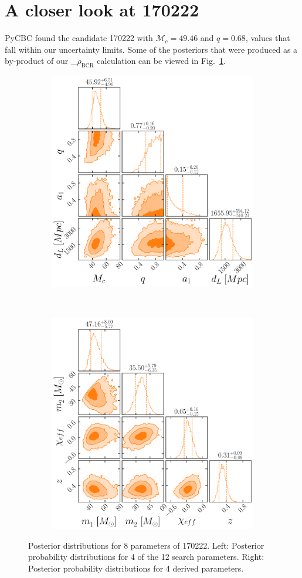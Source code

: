 \documentclass[%
 nofootinbib,
 amsmath,amssymb,
 aps,
 twocolumn,
 superscriptaddress
]{revtex4-2}
\newcommand{\mathcmd}[1]{{\sc \relax\ifmmode#1\else $#1$\fi}\xspace}
\newcommand{\bcr}{\mathcmd{\rho_\text{BCR}}}
\begin{document}



\section{A closer look at 170222}\label{apdx:170222}
PyCBC found the candidate 170222 with $\mathcal{M}_c=49.46$ and $q=0.68$, values that fall within our uncertainty limits. Some of the posteriors that were produced as a by-product of our \bcr calculation can be viewed in Fig.~\ref{fig:170222}.

\begin{figure}
    \centering
    \begin{subfigure}
        \centering
        \includegraphics[width=0.45\linewidth]{170222_prior_posterior.png}
    \end{subfigure}
    ~ 
    \begin{subfigure}
        \centering
        \includegraphics[width=0.45\linewidth]{170222_source_posterior.png}
    \end{subfigure}
    \caption{Posterior distributions for 8 parameters of 170222. 
    Left: Posterior probability distributions for 4 of the 12 search parameters.
    Right: Posterior probability distributions for 4 derived parameters.
    \label{fig:170222}}
\end{figure}
\end{document}
